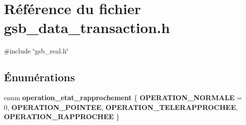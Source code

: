 \section{Référence du fichier gsb\_\-data\_\-transaction.h}
\label{gsb__data__transaction_8h}
{\ttfamily \#include \char`\"{}gsb\_\-real.h\char`\"{}}\par
\subsection*{Énumérations}
\begin{DoxyCompactItemize}
\item 
enum {\bf operation\_\-etat\_\-rapprochement} \{ {\bf OPERATION\_\-NORMALE} =  0, 
{\bf OPERATION\_\-POINTEE}, 
{\bf OPERATION\_\-TELERAPPROCHEE}, 
{\bf OPERATION\_\-RAPPROCHEE}
 \}
\end{DoxyCompactItemize}
